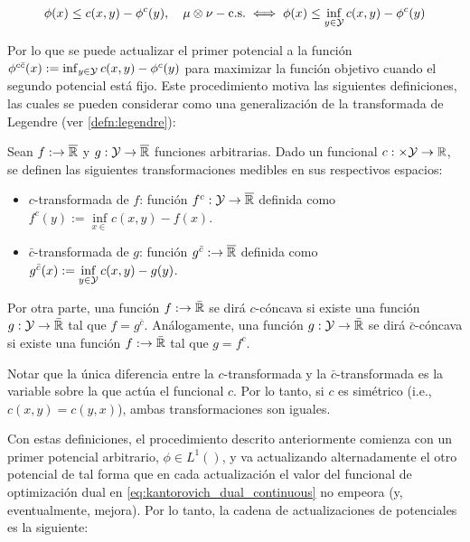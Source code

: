 \begin{equation}
	\phi(x) \leq c(x,y) - \phi^c(y), \quad \mu\otimes\nu-\text{c.s.}
	\iff
	\phi(x) \leq \inf_{y\in\mathcal{Y}} c(x,y) - \phi^c(y)
\end{equation}

Por lo que se puede actualizar el primer potencial a la función $\phi^{c\bar c}(x) := \inf_{y\in\mathcal{Y}} c(x,y) - \phi^c(y)$ para maximizar la función objetivo cuando el segundo potencial está fijo. Este procedimiento motiva las siguientes definiciones, las cuales se pueden considerar como una generalización de la transformada de Legendre (ver \autoref{defn:legendre}):

\begin{defn}
	\label{defn:c_transform}
	Sean $f:\to \overline{\mathbb{R}}$ y $g:\mathcal{Y}\to \overline{\mathbb{R}}$ funciones arbitrarias. Dado un funcional $c:\times\mathcal{Y}\to\mathbb{R}$, se definen las siguientes transformaciones medibles en sus respectivos espacios:

	\begin{itemize}
		\item $c$-transformada  de $f$: función $f^c:\mathcal{Y}\to\overline{\mathbb{R}}$ definida como $f^c(y) := \inf\limits_{x\in\xspace} c(x,y) - f(x)$.

		\item $\bar c$-transformada  de $g$: función $g^{\bar c}:\to\overline{\mathbb{R}}$ definida como $g^{\bar c}(x) := \inf\limits_{y\in\mathcal{Y}} c(x,y) - g(y)$.
	\end{itemize}

	Por otra parte, una función $f:\to\bar{\mathbb{R}}$ se dirá $c$-cóncava si existe una función $g:\mathcal{Y}\to\bar{\mathbb{R}}$ tal que $f=g^{\bar c}$. Análogamente, una función $g:\mathcal{Y}\to\bar{\mathbb{R}}$ se dirá $\bar c$-cóncava si existe una función $f:\to\bar{\mathbb{R}}$ tal que $g=f^c$.
\end{defn}

Notar que la única diferencia entre la $c$-transformada y la $\bar c$-transformada es la variable sobre la que actúa el funcional $c$. Por lo tanto, si $c$ es simétrico (i.e., $c(x,y)=c(y,x)$), ambas transformaciones son iguales.

Con estas definiciones, el procedimiento descrito anteriormente comienza con un primer potencial arbitrario, $\phi\in L^1(\xspace)$, y va actualizando alternadamente el otro potencial de tal forma que en cada actualización el valor del funcional de optimización dual en \eqref{eq:kantorovich_dual_continuous} no empeora (y, eventualmente, mejora). Por lo tanto, la cadena de actualizaciones de potenciales es la siguiente:

